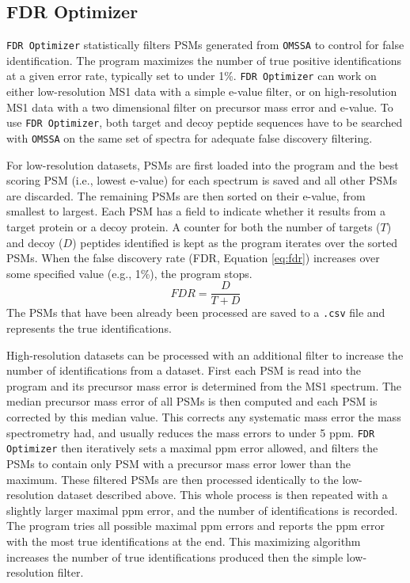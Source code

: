 \subsection*{FDR Optimizer}
\texttt{FDR Optimizer} statistically filters PSMs generated from \texttt{OMSSA} to control for false identification. The program maximizes the number of true positive identifications at a given error rate, typically set to under 1\%. \texttt{FDR Optimizer} can work on either low-resolution MS1 data with a simple e-value filter, or on high-resolution MS1 data with a two dimensional filter on precursor mass error and e-value. To use \texttt{FDR Optimizer}, both target and decoy peptide sequences have to be searched with \texttt{OMSSA} on the same set of spectra for adequate false discovery filtering. 

For low-resolution datasets, PSMs are first loaded into the program and the best scoring PSM (i.e., lowest e-value) for each spectrum is saved and all other PSMs are discarded. The remaining PSMs are then sorted on their e-value, from smallest to largest. Each PSM has a field to indicate whether it results from a target protein or a decoy protein. A counter for both the number of targets ($T$) and decoy ($D$) peptides identified is kept as the program iterates over the sorted PSMs. When the false discovery rate (FDR, Equation \ref{eq:fdr}) increases over some specified value (e.g., 1\%), the program stops.
\begin{equation}
FDR =\frac{D}{T + D}
\label{eq:fdr}
\end{equation}
The PSMs that have been already been processed are saved to a \texttt{.csv} file and represents the true identifications. 

High-resolution datasets can be processed with an additional filter to increase the number of identifications from a dataset. First each PSM is read into the program and its precursor mass error is determined from the MS1 spectrum. The median precursor mass error of all PSMs is then computed and each PSM is corrected by this median value. This corrects any systematic mass error the mass spectrometry had, and usually reduces the mass errors to under 5 ppm. \texttt{FDR Optimizer} then iteratively sets a maximal ppm error allowed, and filters the PSMs to contain only PSM with a precursor mass error lower than the maximum. These filtered PSMs are then processed identically to the low-resolution dataset described above. This whole process is then repeated with a slightly larger maximal ppm error, and the number of identifications is recorded. The program tries all possible maximal ppm errors and reports the ppm error with the most true identifications at the end. This maximizing algorithm increases the number of true identifications produced then the simple low-resolution filter.

